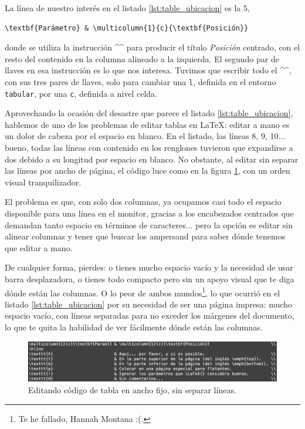 La línea de nuestro interés en el listado \ref{lst:table_ubicacion} es la 5,

\begin{lstlisting}[style=latex,numbers=none]
\textbf{Parámetro} & \multicolumn{1}{c}{\textbf{Posición}}
\end{lstlisting}

\noindent donde se utiliza la instrucción ^\multicolumn^ para producir el título \emph{Posición} centrado, con el resto del contenido en la columna alineado a la izquierda. El segundo par de llaves en esa instrucción es lo que nos interesa. Tuvimos que escribir todo el ^\multicolumn^, con sus tres pares de llaves, solo para cambiar una \texttt{l}, definida en el entorno \texttt{tabular}, por una \texttt{c}, definida a nivel celda.

Aprovechando la ocasión del desastre que parece el listado \ref{lst:table_ubicacion}, hablemos de uno de los problemas de editar tablas en \LaTeX{}: editar a mano es un dolor de cabeza por el espacio en blanco. En el listado, las líneas 8, 9, 10... bueno, todas las líneas con contenido en los renglones tuvieron que expandirse a dos debido a su longitud por espacio en blanco. No obstante, al editar sin separar las líneas por ancho de página, el código luce como en la figura \ref{fig:codigo_tabla_espacio}, con un orden visual tranquilizador.

El problema es que, con solo dos columnas, ya ocupamos casi todo el espacio disponible para una línea en el monitor, gracias a los encabezados centrados que demandan tanto espacio en términos de caracteres... pero la opción es editar sin alinear columnas y tener que buscar los ampersand para saber dónde tenemos que editar a mano.

De cualquier forma, pierdes: o tienes mucho espacio vacío y la necesidad de usar barra desplazadora, o tienes todo compacto pero sin un apoyo visual que te diga dónde están las columnas. O lo peor de ambos mundos\footnote{Te he fallado, Hannah Montana :(.}, lo que ocurrió en el listado \ref{lst:table_ubicacion} por su necesidad de ser una página impresa: mucho espacio vacío, con líneas separadas para no exceder los márgenes del documento, lo que te quita la habilidad de ver fácilmente dónde están las columnas.

\begin{figure}[ht!]
	\centering
	\includegraphics[width=\linewidth]{img/table_code_space.png}
	\caption{Editando código de tabla en ancho fijo, sin separar líneas.}
	\label{fig:codigo_tabla_espacio}
\end{figure}



